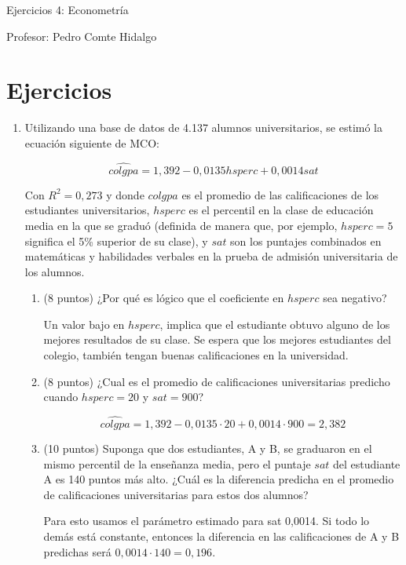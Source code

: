 \documentclass[10pt,a4paper]{article}
\begin{document}
\vspace{5cm}

\begin{center}
    {\Large  Ejercicios 4: Econometría }

Profesor:    Pedro Comte Hidalgo
\end{center}



\section{Ejercicios}
\begin{enumerate}
    \item Utilizando una base de datos de 4.137 alumnos universitarios, se estimó la ecuación siguiente de MCO:

    
$$\hat{colgpa} =1,392 -0,0135 hsperc + 0,0014 sat$$

Con $R^2=0,273$ y donde $colgpa$ es el promedio de las calificaciones de los estudiantes universitarios,
$hsperc$ es el percentil en la clase de educación media en la que se graduó (definida de manera que, por
ejemplo, $hsperc= 5$ significa el 5\% superior de su clase), y $sat$ son los puntajes combinados en
matemáticas y habilidades verbales en la prueba de admisión universitaria de los alumnos.
\begin{enumerate} 
\item (8 puntos) ¿Por qué es lógico que el coeficiente en $hsperc$ sea negativo?

{\color{blue} Un valor  bajo en $hsperc$, implica que el estudiante obtuvo alguno de los mejores resultados de su clase. Se espera que los mejores estudiantes del colegio, también tengan buenas calificaciones en la universidad.  }
\item  (8 puntos) ¿Cual es el promedio de calificaciones universitarias predicho cuando $hsperc= 20$ y $sat=900$?

{\color{blue} $$\hat{colgpa} =1,392 -0,0135 \cdot 20 + 0,0014 \cdot 900=2,382$$}


\item (10 puntos) Suponga que dos estudiantes, A y B, se graduaron en el mismo percentil de la enseñanza media, pero el puntaje $sat$ del estudiante A es 140 puntos más alto. ¿Cuál es la diferencia predicha en el promedio
de calificaciones universitarias para estos dos alumnos? 

{\color{blue} Para esto usamos el parámetro estimado para sat 0,0014. Si todo lo demás está constante, entonces la diferencia en las calificaciones de A y B predichas será $0,0014\cdot 140=0,196$.}


\end{enumerate}
\end{enumerate}
\end{document}
